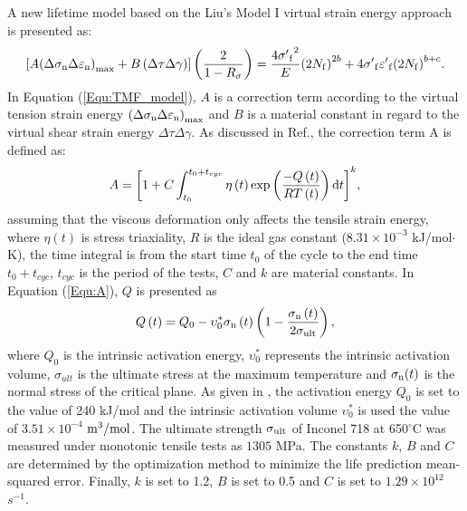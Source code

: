 A new lifetime model based on the Liu's Model I virtual strain energy approach is presented as:
\begin{equation}
\left[ {A{{\left( {\Delta {\sigma _{\rm n}}\Delta {\varepsilon _{\rm n}}} \right)}_{\max }} + B\left( {\Delta \tau \Delta \gamma } \right)} \right]\left( {\frac{2}{{1 - {R_\sigma }}}} \right)
= \frac{{4{{\sigma '}_{\rm f}}^2}}{E}{\left( {2{N_{\rm f}}} \right)^{2b}} + 4{{\sigma '}_{\rm f}}{{\varepsilon '}_{\rm f}}{\left( {2{N_{\rm f}}} \right)^{b + c}}.
\label{Equ:TMF_model}
\end{equation}
In Equation (\ref{Equ:TMF_model}), $A$ is a correction term according to the virtual tension strain energy ${{\left( {\Delta {\sigma _{\rm n}}\Delta {\varepsilon _{\rm n}}} \right)}_{\max }}$ and $B$ is a material constant in regard to the virtual shear strain energy ${\Delta \tau \Delta \gamma }$.
As discussed in Ref.\cite{Vose2013}, the correction term A is defined as:
\begin{equation}
A = {\left[ {1 + C\int_{{t_0}}^{{t_0} + {t_{cyc}}} {\eta \left( t \right)\exp \left( {\frac{{ - Q\left( t \right)}}{{RT\left( t \right)}}} \right){\rm{d}}t} } \right]^k},
\label{Equ:A}
\end{equation}
assuming that the viscous deformation only affects the tensile strain energy, where $\eta \left( t \right)$ is stress triaxiality, $R$ is the ideal gas constant ($8.31\times10^{-3}$ kJ/mol$\cdot$K), the time integral is from the start time $t_0$ of the cycle to the end time $t_0 + t_{cyc}$, $t_{cyc}$ is the period of the tests, $C$ and $k$ are material constants.
In Equation (\ref{Equ:A}), $Q$ is presented \cite{Warren2006,Warren2008} as
\begin{equation}
Q\left( t \right) = {Q_0} - \upsilon _0^*{\sigma _{\rm n}}\left( t \right)\left( {1 - \frac{{{\sigma _{\rm n}}\left( t \right)}}{{2{\sigma _{\rm{ult}}}}}} \right),
\label{Equ:creep_activation_energy}
\end{equation}
where $Q_0$ is the intrinsic activation energy, $\upsilon _0^*$ represents the intrinsic activation volume, $\sigma_{ult}$ is the ultimate stress at the maximum temperature and $\sigma_{\rm n}(t)$ is the normal stress of the critical plane.
As given in \cite{Warren2008}, the activation energy $Q_0$ is set to the value of 240 kJ/mol and the intrinsic activation volume $\upsilon _0^*$ is used the value of $3.51\times10^{-4}$ $\rm{m}^{3}/\rm{mol}$. The ultimate strength $\sigma_{\rm{ult}}$ of Inconel 718 at 650$^\circ$C was measured under monotonic tensile tests as $1305$ MPa. The constants $k$, $B$ and $C$ are determined by the optimization method to minimize the life prediction mean-squared error. Finally, $k$ is set to 1.2, $B$ is set to 0.5 and $C$ is set to $1.29\times10^{12}$ $s^{-1}$.

